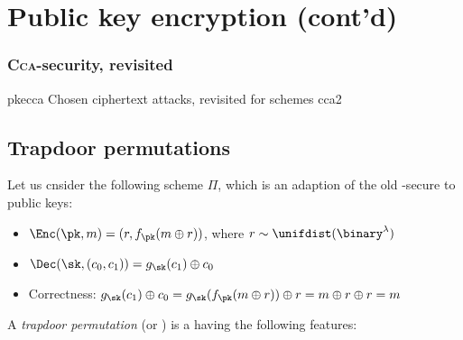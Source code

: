 \section{Public key encryption (cont'd)} 

\subsubsection{\textsc{Cca}-security, revisited}

\begin{cryptogame}
    {pkecca}
    {Chosen ciphertext attacks, revisited for \pke{} schemes}
    {cca2}
    

    \cseqdelay
    \cseqbeginloop


    \cseqendloop
    \cseqdelay



    \cseqdelay
    \cseqbeginloop


    \cseqendloop
    \cseqdelay

\end{cryptogame}

\subsection{Trapdoor permutations}

Let us cnsider the following scheme $\Pi$, which is an adaption of the old \cpa-secure \ske{} to public keys:
\begin{itemize}
    \item $\Enc(\pk, m) = (r, f_\pk(m \xor r))$, where $r \sim \unifdist(\binary^\lambda)$
    \item $\Dec(\sk, (c_0, c_1)) = g_\sk(c_1) \xor c_0$
    \item Correctness: $g_\sk(c_1) \xor c_0 = g_\sk(f_\pk (m \xor r)) \xor r = m \xor r \xor r = m$
\end{itemize}

A \emph{trapdoor permutation} (or \tdp) is a \owp{} having the following features:

